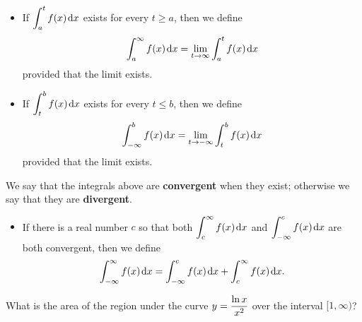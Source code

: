 \vfill

\newpage

\begin{definition}\,
\begin{itemize}
\item If $\displaystyle\int_a^tf(x)\mkern 2mu \mathrm{d} x$ exists for every $t\ge a$, then we define
\begin{equation*}
\int_a^\infty f(x)\mkern 2mu \mathrm{d} x = \lim_{t\to\infty}\int_a^t f(x)\mkern 2mu \mathrm{d} x
\end{equation*}
provided that the limit exists.
\item If $\displaystyle\int_t^bf(x)\mkern 2mu \mathrm{d} x$ exists for every $t\le b$, then we define
\begin{equation*}
\int_{-\infty}^b f(x)\mkern 2mu \mathrm{d} x = \lim_{t\to-\infty}\int_t^b f(x)\mkern 2mu \mathrm{d} x
\end{equation*}
provided that the limit exists.
\end{itemize}
We say that the integrals above are \textbf{convergent} when they exist; otherwise we say that they are \textbf{divergent}.
\begin{itemize}
\item If there is a real number $c$ so that both $\displaystyle\int_c^\infty f(x)\mkern 2mu \mathrm{d} x$ and $\displaystyle\int_{-\infty}^cf(x)\mkern 2mu \mathrm{d} x$ are both convergent, then we define
\begin{equation*}
\int_{-\infty}^\infty f(x)\mkern 2mu \mathrm{d} x = \int_{-\infty}^cf(x)\mkern 2mu \mathrm{d} x + \int_c^\infty f(x)\mkern 2mu \mathrm{d} x.
\end{equation*}
\end{itemize}
\end{definition}


\begin{example}
What is the area of the region under the curve $y=\displaystyle\frac{\ln x}{x^2}$ over the interval $[1,\infty)$?
\end{example}

\ifdefined\SOLUTION
{}
\fi

